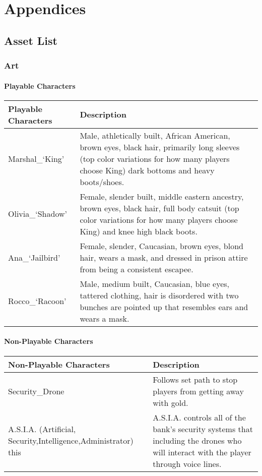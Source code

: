 \documentclass[11pt]{report}
\begin{document}
\chapter{Appendices}

\section{Asset List}

\subsection{Art}

\subsubsection{Playable Characters}


\begin{tabular}{| p{.45\linewidth} | p{.45\linewidth}|} 
    \hline
    Playable Characters & Description \\ \hline
    Marshal\_`King'  &   Male, athletically built, African American, brown eyes, black hair, primarily long sleeves (top color variations for how many players choose King) dark bottoms and heavy boots/shoes.  \\ \hline
    Olivia\_`Shadow' &   Female, slender built, middle eastern ancestry, brown eyes, black hair, full body catsuit (top color variations for how many players choose King) and knee high black boots.  \\ \hline
    Ana\_`Jailbird'  &   Female, slender, Caucasian, brown eyes, blond hair, wears a mask, and dressed in prison attire from being a consistent escapee.  \\ \hline
    Rocco\_`Racoon'  &   Male, medium built, Caucasian, blue eyes, tattered clothing, hair is disordered with two bunches are pointed up that resembles ears and wears a mask.  \\
    \hline
\end{tabular}

\subsubsection{Non-Playable Characters}

\begin{tabular}{| p{.45\linewidth} | p{.45\linewidth} |}
    \hline    
    Non-Playable Characters &   Description  \\ \hline
    Security\_Drone &    Follows set path to stop players from getting away with gold.  \\ \hline
    A.S.I.A. (Artificial, Security,Intelligence,Administrator) this &   A.S.I.A. controls all of the bank’s security systems that including the drones who will interact with the player through voice lines.  \\
    \hline
\end{tabular}
\end{document}
